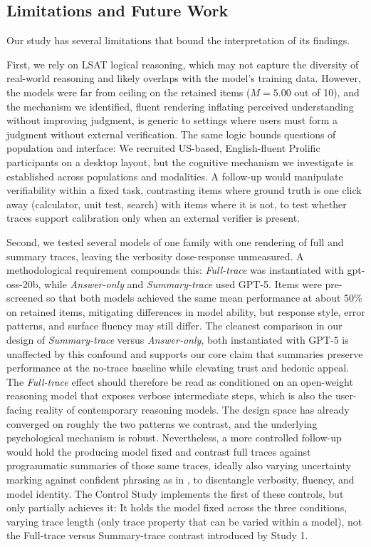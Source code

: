\documentclass[manuscript,review,anonymous]{acmart}
\begin{document}
\subsection{Limitations and Future Work}\label{sec:limitations}

Our study has several limitations that bound the interpretation of its findings.

First, we rely on LSAT logical reasoning, which may not capture the diversity of real-world reasoning and likely overlaps with the model's training data. However, the models were far from ceiling on the retained items ($M = 5.00$ out of 10), and the mechanism we identified, fluent rendering inflating perceived understanding without improving judgment, is generic to settings where users must form a judgment without external verification. The same logic bounds questions of population and interface: We recruited US-based, English-fluent Prolific participants on a desktop layout, but the cognitive mechanism we investigate is established across populations and modalities. A follow-up would manipulate verifiability within a fixed task, contrasting items where ground truth is one click away (calculator, unit test, search) with items where it is not, to test whether traces support calibration only when an external verifier is present.

Second, we tested several models of one family with one rendering of full and summary traces, leaving the verbosity dose-response unmeasured. A methodological requirement compounds this: \textit{Full-trace} was instantiated with gpt-oss-20b, while \textit{Answer-only} and \textit{Summary-trace} used GPT-5. Items were pre-screened so that both models achieved the same mean performance at about 50\% on retained items, mitigating differences in model ability, but response style, error patterns, and surface fluency may still differ. The cleanest comparison in our design of \textit{Summary-trace} versus \textit{Answer-only}, both instantiated with GPT-5 is unaffected by this confound and supports our core claim that summaries preserve performance at the no-trace baseline while elevating trust and hedonic appeal. The \textit{Full-trace} effect should therefore be read as conditioned on an open-weight reasoning model that exposes verbose intermediate steps, which is also the user-facing reality of contemporary reasoning models. The design space has already converged on roughly the two patterns we contrast, and the underlying psychological mechanism is robust. Nevertheless, a more controlled follow-up would hold the producing model fixed and contrast full traces against programmatic summaries of those same traces, ideally also varying uncertainty marking against confident phrasing as in \citet{kim2024m}, to disentangle verbosity, fluency, and model identity. The Control Study implements the first of these controls, but only partially achieves it: It holds the model fixed across the three conditions, varying trace length (only trace property that can be varied within a model), not the Full-trace versus Summary-trace contrast introduced by Study 1.
\end{document}
